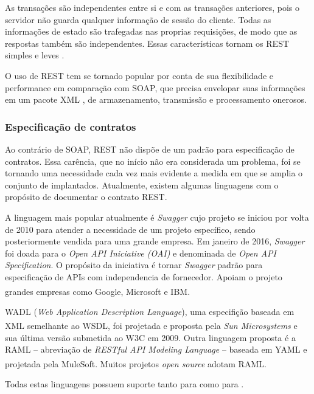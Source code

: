 As transações são independentes entre si e com as transações anteriores, pois o
servidor não guarda qualquer informação de sessão do cliente. Todas as
informações de estado são trafegadas nas proprias requisições, de modo que as
respostas também são independentes. Essas características tornam os \wss{} REST
simples e leves \cite{mumbaikar2013web}.

O uso de REST tem se tornado popular por conta de sua flexibilidade e
performance em comparação com SOAP, que precisa envelopar suas informações em
um pacote XML \cite{mumbaikar2013web}, de armazenamento, transmissão e
processamento onerosos.

\subsubsection{Especificação de contratos}
\vspace{-6mm}

Ao contrário de SOAP, REST não dispõe de um padrão para especificação de
contratos. Essa carência, que no início não era considerada um problema, foi se
tornando uma necessidade cada vez mais evidente a medida em que se amplia o
conjunto de \wss{} implantados. Atualmente, existem algumas linguagens com o
propósito de documentar o contrato REST.

A linguagem mais popular atualmente é \textit{Swagger} cujo projeto se iniciou
por volta de 2010 para atender a necessidade de um projeto específico, sendo posteriormente
vendida para uma grande empresa. Em janeiro de 2016, \textit{Swagger} foi doada
para o \textit{Open API Iniciative (OAI)} e denominada de \textit{Open API
Specification}. O propósito da iniciativa é tornar \textit{Swagger} padrão para
especificação de APIs com independencia de fornecedor. Apoiam o projeto grandes
empresas como Google\textsuperscript{\textregistered},
Microsoft\textsuperscript{\textregistered} e
IBM\textsuperscript{\textregistered}.

WADL (\textit{Web Application Description Language}), uma especifição baseada em
XML semelhante ao WSDL, foi projetada e proposta pela \textit{Sun
Microsystems}\textsuperscript{\textregistered} e sua última versão submetida
ao W3C em 2009. Outra linguagem proposta é a RAML\cite{RAML} -- abreviação de
\textit{RESTful API Modeling Language} -- baseada em YAML e projetada pela
MuleSoft\textsuperscript{\textregistered}. Muitos projetos \textit{open source} adotam RAML.

Todas estas linguagens possuem suporte tanto para \CdFirst{} como para
\CtFirst{} \cite{wideberg2015restful}.



